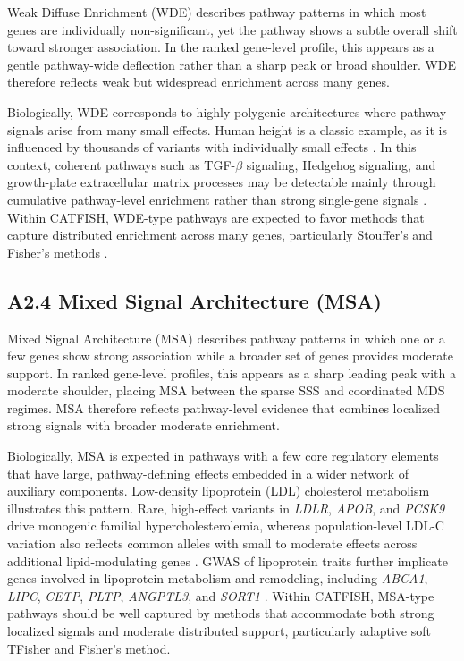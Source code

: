 \documentclass[unnumsec,webpdf,contemporary,large]{oup-authoring-template}%
\theoremstyle{thmstyleone}%
\theoremstyle{thmstyletwo}%
\theoremstyle{thmstylethree}%
\begin{document}
\begin{appendices}
Weak Diffuse Enrichment (WDE) describes pathway patterns in which most genes are individually non-significant, yet the pathway shows a subtle overall shift toward stronger association. In the ranked gene-level profile, this appears as a gentle pathway-wide deflection rather than a sharp peak or broad shoulder. WDE therefore reflects weak but widespread enrichment across many genes.

Biologically, WDE corresponds to highly polygenic architectures where pathway signals arise from many small effects. Human height is a classic example, as it is influenced by thousands of variants with individually small effects \citep{Guo2018HeightGWAS, Yengo2022HeightSaturation}. In this context, coherent pathways such as TGF-\(\beta\) signaling, Hedgehog signaling, and growth-plate extracellular matrix processes may be detectable mainly through cumulative pathway-level enrichment rather than strong single-gene signals \citep{LangoAllen2010Height, Guo2018HeightGWAS}. Within CATFISH, WDE-type pathways are expected to favor methods that capture distributed enrichment across many genes, particularly Stouffer's and Fisher's methods \citep{deLeeuw2015MAGMA}.

\subsection{A2.4 Mixed Signal Architecture (MSA)}

Mixed Signal Architecture (MSA) describes pathway patterns in which one or a few genes show strong association while a broader set of genes provides moderate support. In ranked gene-level profiles, this appears as a sharp leading peak with a moderate shoulder, placing MSA between the sparse SSS and coordinated MDS regimes. MSA therefore reflects pathway-level evidence that combines localized strong signals with broader moderate enrichment.

Biologically, MSA is expected in pathways with a few core regulatory elements that have large, pathway-defining effects embedded in a wider network of auxiliary components. Low-density lipoprotein (LDL) cholesterol metabolism illustrates this pattern. Rare, high-effect variants in \textit{LDLR}, \textit{APOB}, and \textit{PCSK9} drive monogenic familial hypercholesterolemia, whereas population-level LDL-C variation also reflects common alleles with small to moderate effects across additional lipid-modulating genes \citep{Umlai2025LDLC, Peloso2022WGSbloodlipids}. GWAS of lipoprotein traits further implicate genes involved in lipoprotein metabolism and remodeling, including \textit{ABCA1}, \textit{LIPC}, \textit{CETP}, \textit{PLTP}, \textit{ANGPTL3}, and \textit{SORT1} \citep{Chasman2009LipoproteinProfiles}. Within CATFISH, MSA-type pathways should be well captured by methods that accommodate both strong localized signals and moderate distributed support, particularly adaptive soft TFisher and Fisher's method.


\end{appendices}
\end{document}
